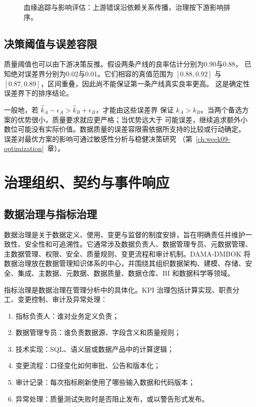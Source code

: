 \begin{figure}[htbp]
\centering
{}
\caption{血缘追踪与影响评估：上游错误沿依赖关系传播，治理按下游影响排序。}
\end{figure}

\subsection{决策阈值与误差容限}
质量阈值也可以由下游决策反推。假设两条产线的良率估计分别为0.90与0.88，
已知绝对误差界分别为0.02与0.01。它们相容的真值范围为 \([0.88,0.92]\) 与
\([0.87,0.89]\)，区间重叠，因此尚不能保证第一条产线真实良率更高。
这是确定性误差界下的排序结论。

一般地，若 \(\hat k_A-\epsilon_A>\hat k_B+\epsilon_B\)，才能由这些误差界
保证 \(k_A>k_B\)。当两个备选方案的优势很小，质量要求就应更严格；当优势远大于
可能误差，继续追求额外小数位可能没有实际价值。数据质量的误差容限需依据所支持的比较或行动确定。
误差对最优方案的影响可通过敏感性分析与稳健决策研究
（第~\ref{ch:week09-optimization}~章）。

\section{治理组织、契约与事件响应}
\subsection{数据治理与指标治理}

数据治理是关于数据定义、使用、变更与监督的制度安排，旨在明确责任并维护一致性、安全性和可追溯性。它通常涉及数据负责人、数据管理专员、元数据管理、主数据管理、权限、安全、质量规则、变更流程和审计机制。DAMA-DMBOK 将数据治理放在数据管理知识体系的中心，并围绕其组织数据架构、建模、存储、安全、集成、主数据、元数据、数据质量、数据仓库、BI 和数据科学等领域。

指标治理是数据治理在管理分析中的具体化。KPI 治理包括计算实现、职责分工、变更控制、审计及异常处理：
\begin{enumerate}
  \item 指标负责人：谁对业务定义负责；
  \item 数据管理专员：谁负责数据源、字段含义和质量规则；
  \item 技术实现：SQL、语义层或数据产品中的计算逻辑；
  \item 变更流程：口径变化如何审批、公告和版本化；
  \item 审计记录：每次指标刷新使用了哪些输入数据和代码版本；
  \item 异常处理：质量测试失败时是否阻止发布，或以警告形式发布。
\end{enumerate}

